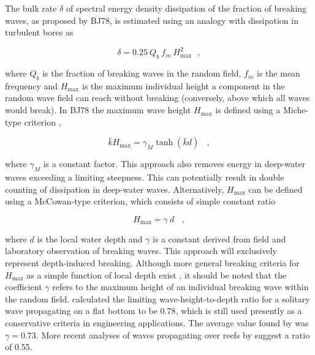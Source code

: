 The bulk rate $\delta$ of spectral energy density dissipation of the fraction
of breaking waves, as proposed by BJ78, is estimated using an analogy with
dissipation in turbulent bores as


\begin{equation}
\delta = 0.25 \: Q_b \: f_m \: H_{\max}^2 \:\:\: , \label{eq:BJ78_base}
\end{equation}

\noindent
where $Q_b$ is the fraction of breaking waves in the random field, $f_m$ is
the mean frequency and $H_{\max}$ is the maximum individual height a component
in the random wave field can reach without breaking (conversely, above which
all waves would break). In BJ78 the maximum wave height $H_{\max}$ is defined
using a Miche-type criterion \citep{art:Miche44},


\begin{equation}
\bar{k} H_{\max} = \gamma_M \tanh ( \bar{k} d )
\:\:\:\ , \label{eq:BJ78_Miche}
\end{equation}

\noindent
where $\gamma_M$ is a constant factor. This approach also removes energy in
deep-water waves exceeding a limiting steepness. This can potentially result
in double counting of dissipation in deep-water waves. Alternatively,
$H_{\max}$ can be defined using a McCowan-type criterion, which consists of
simple constant ratio


\begin{equation}
H_{\max} = \gamma \: d \:\:\:\ , \label{eq:BJ78_McC}
\end{equation}

\noindent
where $d$ is the local water depth and $\gamma$ is a constant derived from
field and laboratory observation of breaking waves. This approach will
exclusively represent depth-induced breaking.  Although more general breaking
criteria for $H_{\max}$ as a simple function of local depth exist
\citep[e.g.,][]{art:TG83}, it should be noted that the coefficient $\gamma$
refers to the maximum height of an individual breaking wave within the random
field. \cite{art:M1894} calculated the limiting wave-height-to-depth ratio for
a solitary wave propagating on a flat bottom to be 0.78, which is still used
presently as a conservative criteria in engineering applications. The average
value found by \cite{pro:BJ78} was $\gamma = 0.73$. More recent analyses of
waves propagating over reefs by \cite{art:Nel94, art:Nel97} suggest a ratio of
0.55.

